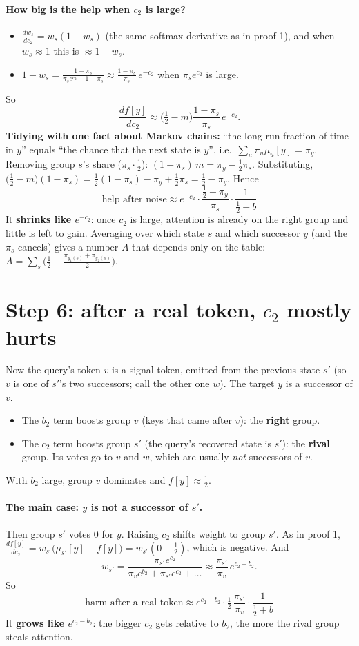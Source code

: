 \documentclass[11pt]{article}
\newcommand{\1}{\mathbf{1}}
\begin{document}
\paragraph{How big is the help when $c_2$ is large?}
\begin{itemize}
\item $\frac{dw_s}{dc_2}=w_s(1-w_s)$ (the same softmax derivative as in proof 1), and when $w_s\approx1$ this is
$\approx1-w_s$.
\item $1-w_s=\frac{1-\pi_s}{\pi_se^{c_2}+1-\pi_s}\approx\frac{1-\pi_s}{\pi_s}\,e^{-c_2}$ when $\pi_se^{c_2}$ is large.
\end{itemize}
So
\[
\frac{df[y]}{dc_2}\approx\Big(\tfrac12-m\Big)\frac{1-\pi_s}{\pi_s}\,e^{-c_2}.
\]
\textbf{Tidying with one fact about Markov chains:} ``the long-run fraction of time in $y$'' equals
``the chance that the next state is $y$'', i.e.\ $\sum_u\pi_u\mu_u[y]=\pi_y$. Removing group $s$'s share
($\pi_s\cdot\tfrac12$): $(1-\pi_s)\,m=\pi_y-\tfrac12\pi_s$. Substituting,
$\big(\tfrac12-m\big)(1-\pi_s)=\tfrac12(1-\pi_s)-\pi_y+\tfrac12\pi_s=\tfrac12-\pi_y$. Hence
\[
\boxed{\ \text{help after noise}\approx e^{-c_2}\cdot\frac{\tfrac12-\pi_y}{\pi_s}\cdot\frac1{\tfrac12+b}\ }
\]
It \textbf{shrinks like $e^{-c_2}$}: once $c_2$ is large, attention is already on the right group and
little is left to gain. Averaging over which state $s$ and which successor $y$ (and the $\pi_s$ cancels)
gives a number $A$ that depends only on the table:
$A=\sum_s\big(\tfrac12-\tfrac{\pi_{y_1(s)}+\pi_{y_2(s)}}{2}\big)$.

\section{Step 6: after a real token, $c_2$ mostly hurts}
Now the query's token $v$ is a signal token, emitted from the previous state $s'$ (so $v$ is one of
$s'$'s two successors; call the other one $w$). The target $y$ is a successor of $v$.
\begin{itemize}
\item The $b_2$ term boosts group $v$ (keys that came after $v$): the \textbf{right} group.
\item The $c_2$ term boosts group $s'$ (the query's recovered state is $s'$): the \textbf{rival} group.
Its votes go to $v$ and $w$, which are usually \emph{not} successors of $v$.
\end{itemize}
With $b_2$ large, group $v$ dominates and $f[y]\approx\tfrac12$.

\paragraph{The main case: $y$ is not a successor of $s'$.} Then group $s'$ votes $0$ for $y$. Raising $c_2$
shifts weight to group $s'$. As in proof 1, $\frac{df[y]}{dc_2}=w_{s'}\big(\mu_{s'}[y]-f[y]\big)=w_{s'}(0-\tfrac12)$,
which is negative. And
\[
w_{s'}=\frac{\pi_{s'}e^{c_2}}{\pi_ve^{b_2}+\pi_{s'}e^{c_2}+\dots}\approx\frac{\pi_{s'}}{\pi_v}\,e^{c_2-b_2}.
\]
So
\[
\boxed{\ \text{harm after a real token}\approx e^{c_2-b_2}\cdot\tfrac12\,\frac{\pi_{s'}}{\pi_v}\cdot\frac1{\tfrac12+b}\ }
\]
It \textbf{grows like $e^{c_2-b_2}$}: the bigger $c_2$ gets relative to $b_2$, the more the rival group
steals attention.
\end{document}

